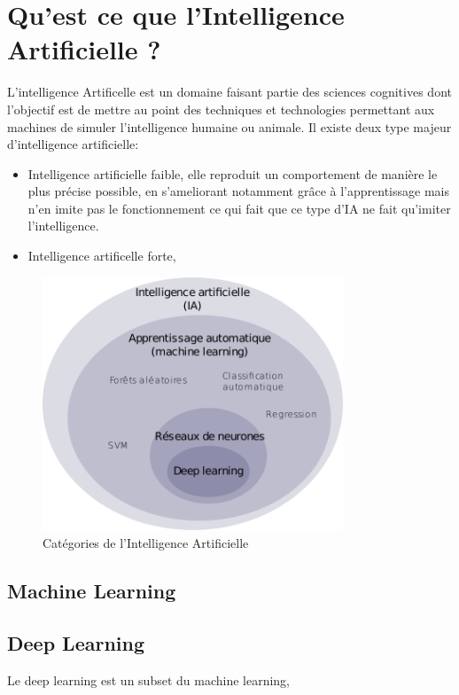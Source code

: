 
\chapter{Qu'est ce que l'Intelligence Artificielle ?}
L'intelligence Artificelle est un domaine faisant partie 
des sciences cognitives dont l'objectif est de mettre au
point des techniques et technologies permettant aux 
machines de simuler l'intelligence humaine ou animale. 
\newline
Il existe deux type majeur d'intelligence artificielle:
\begin{itemize}
    \item Intelligence artificielle faible, elle reproduit
    un comportement de manière le plus précise possible,
    en s'ameliorant notamment grâce à l'apprentissage 
    mais n'en imite pas le fonctionnement ce qui fait que
    ce type d'IA ne fait qu'imiter l'intelligence.
    

    \item Intelligence artificelle forte, 

\end{itemize} 
\begin{figure}[!h]
    \centering
    \includegraphics[width=0.8\textwidth]{Images/aitype}
    \caption{Catégories de l'Intelligence Artificielle}
	\label{fig:categorieIA}
\end{figure}

\newpage
\section{Machine Learning}

\newpage
\section{Deep Learning}
Le deep learning est un subset du machine learning, 

\chapter{}